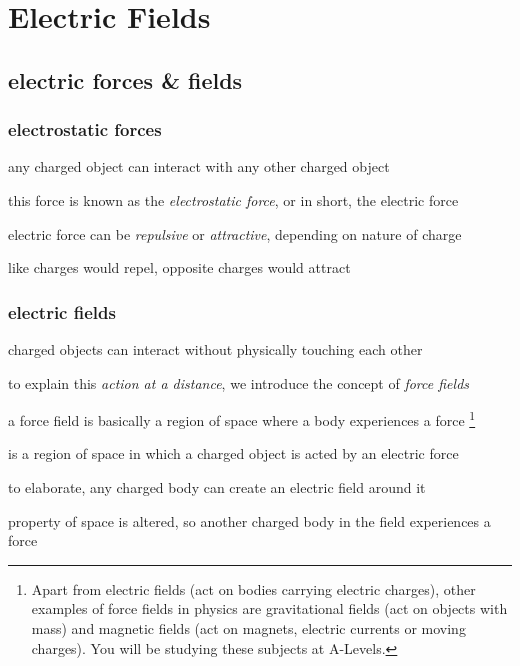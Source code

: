\chapter{\texorpdfstring{Electric Fields}{Electric Fields}}

\section{electric forces \& fields}

\subsection{electrostatic forces}

any charged object can interact with any other charged object

this force is known as the \emph{electrostatic force}, or in short, the electric force

\cmt electric force can be \emph{repulsive} or \emph{attractive}, depending on nature of charge

like charges would repel, opposite charges would attract



\subsection{electric fields}

charged objects can interact without physically touching each other 

to explain this \emph{action at a distance}, we introduce the concept of \emph{force fields}

a force field is basically a region of space where a body experiences a force
\footnote{Apart from electric fields (act on bodies carrying electric charges), other examples of force fields in physics are gravitational fields (act on objects with mass) and magnetic fields (act on magnets, electric currents or moving charges). You will be studying these subjects at A-Levels.}

\begin{ilight}
	\centering {} is a region of space in which a charged object is acted by an electric force
\end{ilight}

to elaborate, any charged body can create an electric field around it

property of space is altered, so another charged body in the field experiences a force

